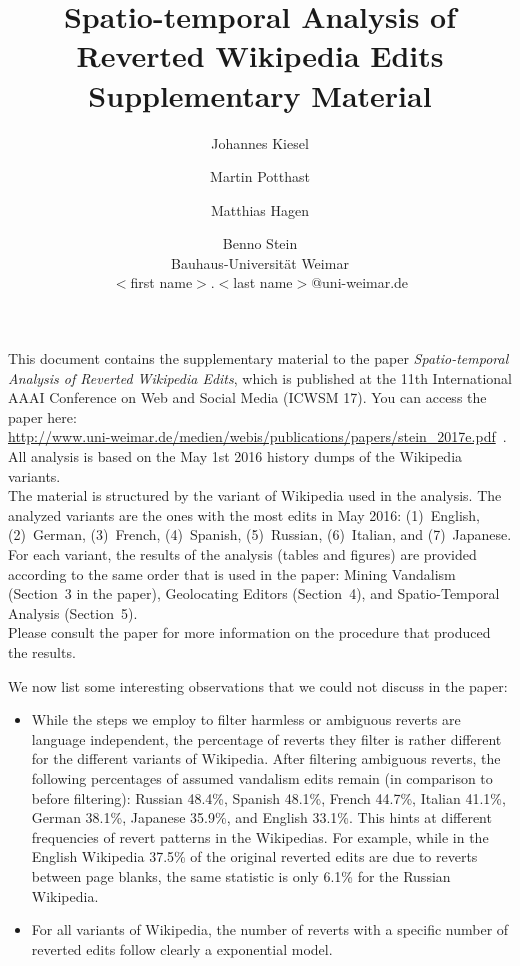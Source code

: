 \documentclass[letterpaper]{article}
\title{Spatio-temporal Analysis of Reverted Wikipedia Edits\\\Large Supplementary Material}
\author{Johannes Kiesel \and Martin Potthast \and Matthias Hagen \and Benno Stein\\
Bauhaus-Universit\"at Weimar \\
$<$first name$>$.$<$last name$>$@uni-weimar.de}
\begin{document}
\maketitle

\noindent
This document contains the supplementary material to the paper {\em Spatio-temporal Analysis of Reverted Wikipedia Edits}, which is published at the 11th International AAAI Conference on Web and Social Media (ICWSM 17). You can access the paper here:\\{\url{http://www.uni-weimar.de/medien/webis/publications/papers/stein_2017e.pdf}}\ .\\[.2\baselineskip]
%
All analysis is based on the May 1st 2016 history dumps of the Wikipedia variants.\\[.2\baselineskip]
%
The material is structured by the variant of Wikipedia used in the analysis. The analyzed variants are the ones with the most edits in May 2016: (1)~English, (2)~German, (3)~French, (4)~Spanish, (5)~Russian, (6)~Italian, and (7)~Japanese.\\[.2\baselineskip]
%
For each variant, the results of the analysis (tables and figures) are provided according to the same order that is used in the paper: Mining Vandalism (Section~3 in the paper), Geolocating Editors (Section~4), and Spatio-Temporal Analysis (Section~5).\\[.2\baselineskip]
%
Please consult the paper for more information on the procedure that produced the results.

\bigskip
\noindent
We now list some interesting observations that we could not discuss in the paper:\\[.2\baselineskip]
\begin{itemize}
\item
While the steps we employ to filter harmless or ambiguous reverts are language independent, the percentage of reverts they filter is rather different for the different variants of Wikipedia. After filtering ambiguous reverts, the following percentages of assumed vandalism edits remain (in comparison to before filtering):
Russian 48.4\%,
Spanish 48.1\%,
French 44.7\%,
Italian 41.1\%,
German 38.1\%,
Japanese 35.9\%, and
English 33.1\%.
This hints at different frequencies of revert patterns in the Wikipedias. For example, while in the English Wikipedia 37.5\% of the original reverted edits are due to reverts between page blanks, the same statistic is only 6.1\% for the Russian Wikipedia.
\item
For all variants of Wikipedia, the number of reverts with a specific number of reverted edits follow clearly a exponential model.
\end{itemize}
\end{document}

